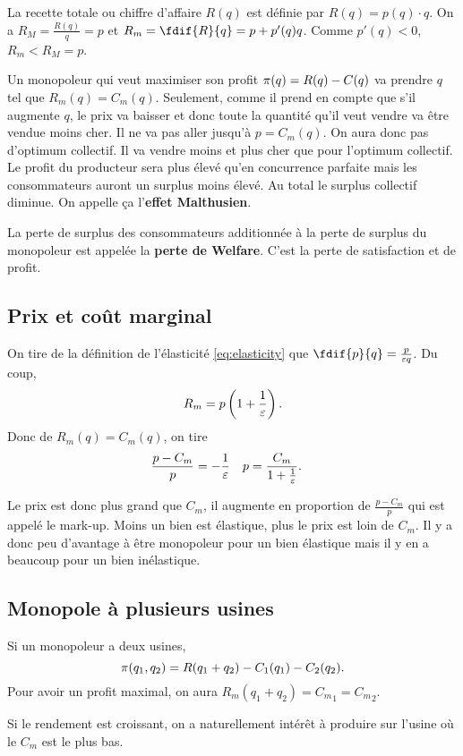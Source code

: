 La recette totale ou chiffre d'affaire $R(q)$ est définie par
$R(q) = p(q) \cdot q$.
On a $R_M = \frac{R(q)}{q} = p$ et $R_m = \fdif{R}{q} = p + p'(q)q$.
Comme $p'(q) < 0$, $R_m < R_M = p$.

Un monopoleur qui veut maximiser son profit $\pi(q) = R(q) - C(q)$
va prendre $q$ tel que $R_m(q) = C_m(q)$.
Seulement, comme il prend en compte que s'il augmente $q$,
le prix va baisser et donc toute la quantité qu'il veut vendre va être vendue
moins cher.
Il ne va pas aller jusqu'à $p = C_m(q)$. On aura donc pas d'optimum collectif.
Il va vendre moins et plus cher que pour l'optimum collectif.
Le profit du producteur sera plus élevé qu'en concurrence parfaite mais
les consommateurs auront un surplus moins élevé.
Au total le surplus collectif diminue.
On appelle ça l'\textbf{effet Malthusien}.

La perte de surplus des consommateurs additionnée à la perte de surplus
du monopoleur est appelée la \textbf{perte de Welfare}.
C'est la perte de satisfaction et de profit.

\subsection{Prix et coût marginal}
On tire de la définition de l'élasticité \eqref{eq:elasticity} que
$\fdif{p}{q} = \frac{p}{\elasticity q}$. Du coup,
\[ R_m = p\left(1+\frac{1}{\varepsilon}\right). \]
Donc de $R_m(q) = C_m(q)$, on tire
\begin{align*}
  \frac{p-C_m}{p} & = -\frac{1}{\varepsilon} &
  p & = \frac{C_m}{1+\frac{1}{\varepsilon}}.
\end{align*}

Le prix est donc plus grand que $C_m$, il augmente en proportion de
$\frac{p-C_m}{p}$ qui est appelé le mark-up.
Moins un bien est élastique, plus le prix est loin de $C_m$.
Il y a donc peu d'avantage à être monopoleur pour un bien élastique
mais il y en a beaucoup pour un bien inélastique.

\subsection{Monopole à plusieurs usines}
Si un monopoleur a deux usines,
\[ \pi(q_1,q_2) = R(q_1 + q_2) - C_1(q_1) - C_2(q_2). \]
Pour avoir un profit maximal, on aura
$R_m(q_1+q_2) = {C_m}_1 = {C_m}_2$.

Si le rendement est croissant, on a naturellement intérêt à produire
sur l'usine où le $C_m$ est le plus bas.

